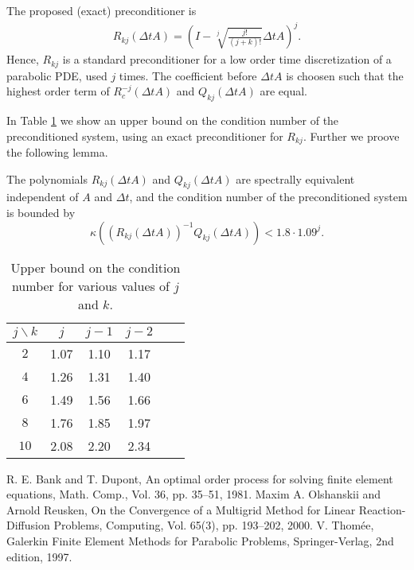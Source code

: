 \documentclass{report}
\begin{document}
The proposed (exact) preconditioner is
\begin{eqnarray*}
R_{kj} (\Delta t A) =\left( I- \sqrt[j]{\frac {j!}{(j+k)!}}\Delta t A \right)^j.
\end{eqnarray*}
Hence, $R_{kj}$ is a standard preconditioner for a low
order time discretization of a parabolic PDE, used
$j$ times.
The coefficient before $\Delta t A$ is choosen such that the
highest order term of $R^{-j}_c(\Delta t A)$
and $Q_{kj} (\Delta t A)$ are equal.

In Table \ref{cond} we show an upper bound on the condition
number of the preconditioned system, using an exact preconditioner
for $R_{kj}$. Further we proove the following lemma.

\begin{lemma}\label{lem1}
The polynomials $R_{kj}(\Delta t A)$ and $Q_{kj}(\Delta t A)$ are
spectrally equivalent independent of $A$ and $\Delta t$, and the condition number of
the preconditioned system is bounded by
\begin{equation*}
\kappa \left( \left( R_{kj}(\Delta t A) \right)^{-1} Q_{kj}(\Delta t
A) \right) < 1.8 \cdot 1.09^j.
\end{equation*}
\end{lemma}

\begin{table}
\begin{center}
\begin{tabular}{|c|c|c|c|c|c|}
\hline
$j\backslash k$& $j$ & $j-1$ & $j-2$ \\ \hline
$2$ & 1.07 & 1.10 & 1.17 \\ \hline
$4$ & 1.26 & 1.31 & 1.40 \\ \hline
$6$ & 1.49 & 1.56 & 1.66 \\ \hline
$8$ & 1.76 & 1.85 & 1.97 \\ \hline
$10$ & 2.08 & 2.20 & 2.34 \\ \hline
\end{tabular}
\end{center}
\caption{Upper bound on the condition number for various values of $j$ and $k$.}
\label{cond}
\end{table}

\begin{thebibliography}{99}
 R. E. Bank and T. Dupont, An optimal order process for
solving finite element equations, Math. Comp., Vol. 36, pp. 35--51,
1981.
 Maxim A. Olshanskii and Arnold
Reusken, On the Convergence of a Multigrid Method for Linear
Reaction-Diffusion Problems, Computing, Vol. 65(3), pp. 193--202,
2000.
 V. Thom\'{e}e, Galerkin Finite Element Methods for
Parabolic Problems, Springer-Verlag, 2nd edition, 1997.
\end{thebibliography}
\end{document}
